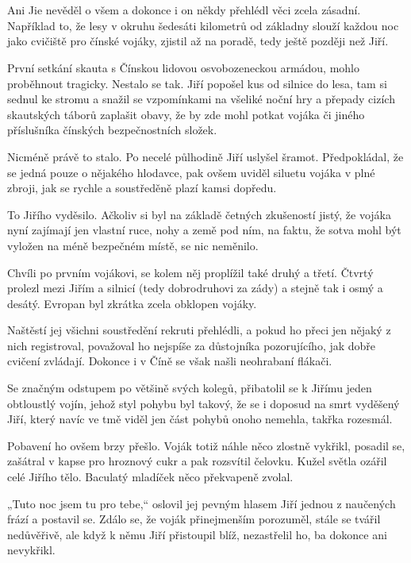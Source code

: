 \chapter{}

Ani Jie nevěděl o všem a dokonce i on někdy přehlédl věci zcela zásadní. Například to, že lesy v okruhu šedesáti kilometrů od základny slouží každou noc jako cvičiště pro čínské vojáky, zjistil až na poradě, tedy ještě později než Jiří.
\vspace{0.75cm}

První setkání skauta s Čínskou lidovou osvobozeneckou armádou, mohlo proběhnout tragicky. Nestalo se tak. Jiří popošel kus od silnice do lesa, tam si sednul ke stromu a snažil se vzpomínkami na všeliké noční hry a přepady cizích skautských táborů zaplašit obavy, že by zde mohl potkat vojáka či jiného příslušníka čínských bezpečnostních složek.

Nicméně právě to stalo. Po necelé půlhodině Jiří uslyšel šramot. Předpokládal, že se jedná pouze o nějakého hlodavce, pak ovšem uviděl siluetu vojáka v plné zbroji, jak se rychle a soustředěně plazí kamsi dopředu. 

To Jiřího vyděsilo. Ačkoliv si byl na základě četných zkušeností jistý, že vojáka nyní zajímají jen vlastní ruce, nohy a země pod ním, na faktu, že sotva mohl být vyložen na méně bezpečném místě, se nic neměnilo.

Chvíli po prvním vojákovi, se kolem něj proplížil také druhý a třetí. Čtvrtý prolezl mezi Jiřím a silnicí (tedy dobrodruhovi za zády) a stejně tak i osmý a desátý. Evropan byl zkrátka zcela obklopen vojáky.

Naštěstí jej všichni soustředění rekruti přehlédli, a pokud ho přeci jen nějaký z nich registroval, považoval ho nejspíše za důstojníka pozorujícího, jak dobře cvičení zvládají. Dokonce i v Číně se však našli neohrabaní flákači.

Se značným odstupem po většině svých kolegů, přibatolil se k Jiřímu jeden obtloustlý vojín, jehož styl pohybu byl takový, že se i doposud na smrt vyděšený Jiří, který navíc ve tmě viděl jen část pohybů onoho nemehla, takřka rozesmál.

Pobavení ho ovšem brzy přešlo. Voják totiž náhle něco zlostně vykřikl, posadil se, zašátral v kapse pro hroznový cukr a pak rozsvítil čelovku. Kužel světla ozářil celé Jiřího tělo. Baculatý mladíček něco překvapeně zvolal.

„Tuto noc jsem tu pro tebe,“ oslovil jej pevným hlasem Jiří jednou z naučených frází a postavil se. Zdálo se, že voják přinejmenším porozuměl, stále se tvářil nedůvěřivě, ale když k němu Jiří přistoupil blíž, nezastřelil ho, ba dokonce ani nevykřikl.

